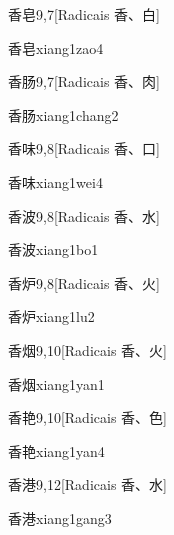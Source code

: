 \begin{entry}{香皂}{9,7}[Radicais ⾹、⽩]
  \begin{phonetics}{香皂}{xiang1zao4}
  \end{phonetics}
\end{entry}

\begin{entry}{香肠}{9,7}[Radicais ⾹、⾁]
  \begin{phonetics}{香肠}{xiang1chang2}
  \end{phonetics}
\end{entry}

\begin{entry}{香味}{9,8}[Radicais ⾹、⼝]
  \begin{phonetics}{香味}{xiang1wei4}
  \end{phonetics}
\end{entry}

\begin{entry}{香波}{9,8}[Radicais ⾹、⽔]
  \begin{phonetics}{香波}{xiang1bo1}
  \end{phonetics}
\end{entry}

\begin{entry}{香炉}{9,8}[Radicais ⾹、⽕]
  \begin{phonetics}{香炉}{xiang1lu2}
  \end{phonetics}
\end{entry}

\begin{entry}{香烟}{9,10}[Radicais ⾹、⽕]
  \begin{phonetics}{香烟}{xiang1yan1}
  \end{phonetics}
\end{entry}

\begin{entry}{香艳}{9,10}[Radicais ⾹、⾊]
  \begin{phonetics}{香艳}{xiang1yan4}
  \end{phonetics}
\end{entry}

\begin{entry}{香港}{9,12}[Radicais ⾹、⽔]
  \begin{phonetics}{香港}{xiang1gang3}
  \end{phonetics}
\end{entry}

